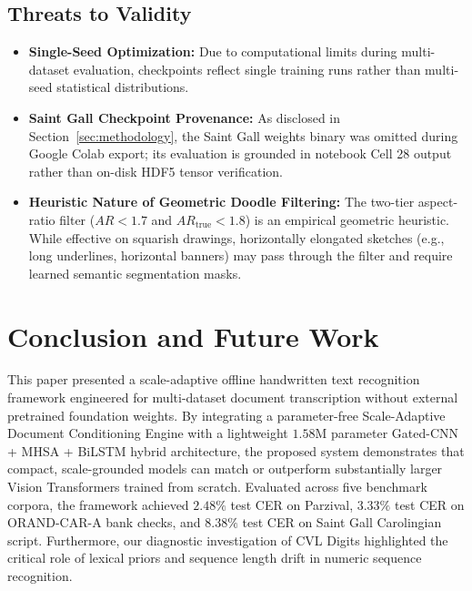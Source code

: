 \documentclass{IEEEtran}
\begin{document}
\FloatBarrier


\subsection{Threats to Validity}

\begin{itemize}

    \item \textbf{Single-Seed Optimization:} Due to computational limits during multi-dataset evaluation, checkpoints reflect single training runs rather than multi-seed statistical distributions.

    \item \textbf{Saint Gall Checkpoint Provenance:} As disclosed in Section~\ref{sec:methodology}, the Saint Gall weights binary was omitted during Google Colab export; its evaluation is grounded in notebook Cell 28 output rather than on-disk HDF5 tensor verification.

    \item \textbf{Heuristic Nature of Geometric Doodle Filtering:} The two-tier aspect-ratio filter ($AR < 1.7$ and $AR_{\text{true}} < 1.8$) is an empirical geometric heuristic. While effective on squarish drawings, horizontally elongated sketches (e.g., long underlines, horizontal banners) may pass through the filter and require learned semantic segmentation masks.

\end{itemize}

\section{Conclusion and Future Work}

\label{sec:conclusion}

This paper presented a scale-adaptive offline handwritten text recognition framework engineered for multi-dataset document transcription without external pretrained foundation weights. By integrating a parameter-free Scale-Adaptive Document Conditioning Engine with a lightweight $1.58\text{M}$ parameter Gated-CNN + MHSA + BiLSTM hybrid architecture, the proposed system demonstrates that compact, scale-grounded models can match or outperform substantially larger Vision Transformers trained from scratch. Evaluated across five benchmark corpora, the framework achieved $2.48\%$ test CER on Parzival, $3.33\%$ test CER on ORAND-CAR-A bank checks, and $8.38\%$ test CER on Saint Gall Carolingian script. Furthermore, our diagnostic investigation of CVL Digits highlighted the critical role of lexical priors and sequence length drift in numeric sequence recognition.
\end{document}
